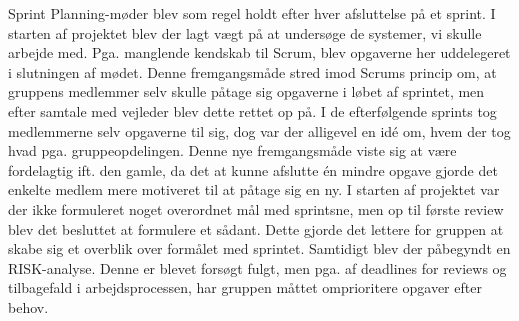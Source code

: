 Sprint Planning-møder blev som regel holdt efter hver afsluttelse på et sprint. I starten af projektet blev der lagt vægt på at undersøge de systemer, vi skulle
arbejde med. Pga. manglende kendskab til Scrum, blev opgaverne her uddelegeret i slutningen af mødet. Denne fremgangsmåde stred imod Scrums princip om, at gruppens
medlemmer selv skulle påtage sig opgaverne i løbet af sprintet, men efter samtale med vejleder blev dette rettet op på. I de efterfølgende sprints tog medlemmerne
selv opgaverne til sig, dog var der alligevel en idé om, hvem der tog hvad pga. gruppeopdelingen. Denne nye fremgangsmåde viste sig at være fordelagtig ift. den gamle,
da det at kunne afslutte én mindre opgave gjorde det enkelte medlem mere motiveret til at påtage sig en ny.
I starten af projektet var der ikke formuleret noget overordnet mål med sprintsne, men op til første review blev det besluttet at formulere et sådant. Dette gjorde
det lettere for gruppen at skabe sig et overblik over formålet med sprintet. Samtidigt blev der påbegyndt en RISK-analyse. Denne er blevet forsøgt fulgt, men
pga. af deadlines for reviews og tilbagefald i arbejdsprocessen, har gruppen måttet omprioritere opgaver efter behov.
